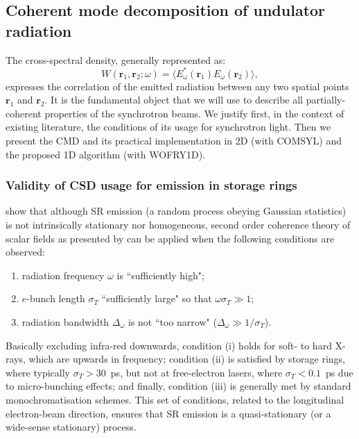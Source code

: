 \documentclass{iucr}              %
\begin{document}
\subsection{Coherent mode decomposition of undulator radiation}\label{sec:CMD}

The cross-spectral density, generally represented as:
\begin{equation}
W(\textbf{r}_1,\textbf{r}_2;\omega) = \big\langle E^*_{\omega}(\textbf{r}_1)  E_{\omega}(\textbf{r}_2)\big\rangle,
\label{eq:CSD_2D}
\end{equation}
expresses the correlation of the emitted radiation between any two spatial points $\textbf{r}_1$ and $\textbf{r}_2$. It is the fundamental object that we will use to describe all partially-coherent properties of the synchrotron beams. We justify first, in the context of existing literature, the conditions of its usage for synchrotron light. Then we present the CMD and its practical implementation in 2D (with COMSYL) and the proposed 1D algorithm (with WOFRY1D).


\subsubsection{Validity of CSD usage for emission in storage rings\\}\label{sec:validity}

 show that although SR emission (a random process obeying Gaussian statistics) is not intrinsically stationary nor homogeneous, second order coherence theory of scalar fields as presented by  can be applied when the following conditions are observed:
\begin{enumerate}[label=(\roman*)]
\item radiation frequency $\omega$ is ``sufficiently high";
\item $e$-bunch length $\sigma_{T}$ ``sufficiently large" so that $\omega\sigma_{T}\gg1$;
\item radiation bandwidth $\Delta_\omega$ is not ``too narrow" ($\Delta_\omega\gg1\big/\sigma_{T}$).
\end{enumerate}
Basically excluding infra-red downwards, condition (i) holds for soft- to hard X-rays, which are upwards in frequency; condition (ii) is satisfied by storage rings, where typically $\sigma_{T}>30$~ps, but not at free-electron lasers, where $\sigma_{T}<0.1$~ps due to micro-bunching effects; and finally, condition (iii) is generally met by standard monochromatisation schemes. This set of conditions, related to the longitudinal electron-beam direction, ensures that SR emission is a quasi-stationary (or a wide-sense stationary) process. 
\end{document}
